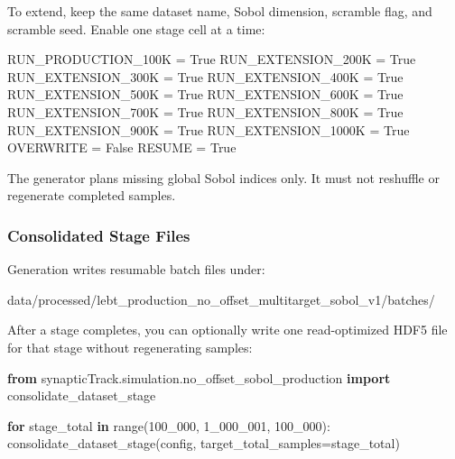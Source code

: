\documentclass[
]{article}
\newenvironment{Shaded}{}{}
\newcommand{\BuiltInTok}[1]{\textcolor[rgb]{0.00,0.50,0.00}{#1}}
\newcommand{\ControlFlowTok}[1]{\textcolor[rgb]{0.00,0.44,0.13}{\textbf{#1}}}
\newcommand{\DecValTok}[1]{\textcolor[rgb]{0.25,0.63,0.44}{#1}}
\newcommand{\ImportTok}[1]{\textcolor[rgb]{0.00,0.50,0.00}{\textbf{#1}}}
\newcommand{\KeywordTok}[1]{\textcolor[rgb]{0.00,0.44,0.13}{\textbf{#1}}}
\newcommand{\NormalTok}[1]{#1}
\newcommand{\OperatorTok}[1]{\textcolor[rgb]{0.40,0.40,0.40}{#1}}
\newcommand{\VariableTok}[1]{\textcolor[rgb]{0.10,0.09,0.49}{#1}}
\begin{document}
To extend, keep the same dataset name, Sobol dimension, scramble flag,
and scramble seed. Enable one stage cell at a time:

\begin{Shaded}
\begin{Highlighting}[]
\NormalTok{RUN\_PRODUCTION\_100K }\OperatorTok{=} \VariableTok{True}
\NormalTok{RUN\_EXTENSION\_200K }\OperatorTok{=} \VariableTok{True}
\NormalTok{RUN\_EXTENSION\_300K }\OperatorTok{=} \VariableTok{True}
\NormalTok{RUN\_EXTENSION\_400K }\OperatorTok{=} \VariableTok{True}
\NormalTok{RUN\_EXTENSION\_500K }\OperatorTok{=} \VariableTok{True}
\NormalTok{RUN\_EXTENSION\_600K }\OperatorTok{=} \VariableTok{True}
\NormalTok{RUN\_EXTENSION\_700K }\OperatorTok{=} \VariableTok{True}
\NormalTok{RUN\_EXTENSION\_800K }\OperatorTok{=} \VariableTok{True}
\NormalTok{RUN\_EXTENSION\_900K }\OperatorTok{=} \VariableTok{True}
\NormalTok{RUN\_EXTENSION\_1000K }\OperatorTok{=} \VariableTok{True}
\NormalTok{OVERWRITE }\OperatorTok{=} \VariableTok{False}
\NormalTok{RESUME }\OperatorTok{=} \VariableTok{True}
\end{Highlighting}
\end{Shaded}

The generator plans missing global Sobol indices only. It must not
reshuffle or regenerate completed samples.

\hypertarget{consolidated-stage-files}{%
\subsubsection{Consolidated Stage
Files}\label{consolidated-stage-files}}

Generation writes resumable batch files under:

\begin{Shaded}
\begin{Highlighting}[]
\NormalTok{data/processed/lebt\_production\_no\_offset\_multitarget\_sobol\_v1/batches/}
\end{Highlighting}
\end{Shaded}

After a stage completes, you can optionally write one read-optimized
HDF5 file for that stage without regenerating samples:

\begin{Shaded}
\begin{Highlighting}[]
\ImportTok{from}\NormalTok{ synapticTrack.simulation.no\_offset\_sobol\_production }\ImportTok{import}\NormalTok{ consolidate\_dataset\_stage}

\ControlFlowTok{for}\NormalTok{ stage\_total }\KeywordTok{in} \BuiltInTok{range}\NormalTok{(}\DecValTok{100\_000}\NormalTok{, }\DecValTok{1\_000\_001}\NormalTok{, }\DecValTok{100\_000}\NormalTok{):}
\NormalTok{    consolidate\_dataset\_stage(config, target\_total\_samples}\OperatorTok{=}\NormalTok{stage\_total)}
\end{Highlighting}
\end{Shaded}
\end{document}
